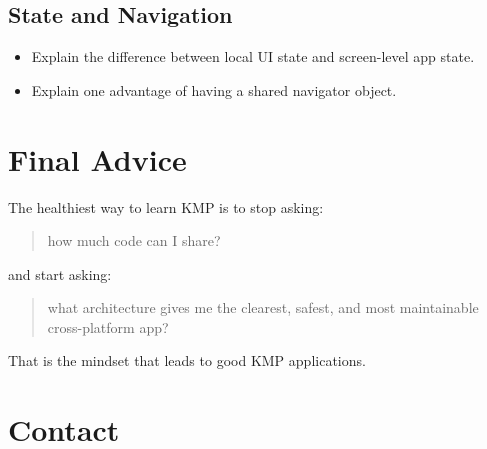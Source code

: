 \documentclass[11pt,a4paper]{article}
\begin{document}
\subsection{State and Navigation}

\begin{itemize}
    \item Explain the difference between local UI state and screen-level app state.
    \item Explain one advantage of having a shared navigator object.
\end{itemize}

\section{Final Advice}

The healthiest way to learn KMP is to stop asking:
\begin{quote}
how much code can I share?
\end{quote}

and start asking:
\begin{quote}
what architecture gives me the clearest, safest, and most maintainable cross-platform app?
\end{quote}

That is the mindset that leads to good KMP applications.

\section{Contact}

\KazeContactBlock
\end{document}
